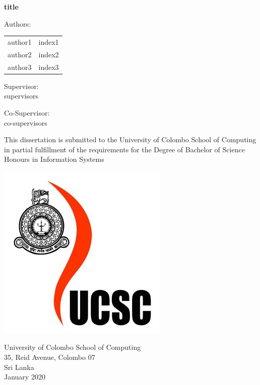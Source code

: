 \documentclass[12pt,a4paper]{report}
\begin{document}
\begin{titlepage}
    \begin{center}
        \textbf{\huge{ \fontsize{24pt}{24pt}\selectfont title}}
        \vspace{1.5cm}
        
        Authors:\\
        \begin{center}
            \begin{tabular}{ l l }
                 author1 & index1  \\ 
                 author2 & index2  \\  
                 author3 & index3    
            \end{tabular}
        \end{center}
        \vspace{1cm}
        Supervisor:\\
        \vspace{0.2cm}
        \small{supervisors}\\
        \vspace{1cm}
        
        Co-Supervisor:\\
        \vspace{0.2cm}
        \small{co-supervisors}\\
        \vspace{1.5cm}
        
        This dissertation is submitted to the University of Colombo School of Computing in partial fulfillment of the requirements for the Degree of Bachelor of Science Honours in Information Systems
        \vspace{1.8cm}
        
        \includegraphics[scale=0.25]{ucsc.jpg}\\
        \vspace{1.5cm}
        
        University of Colombo School of Computing\\
        35, Reid Avenue, Colombo 07\\
        Sri Lanka\\
        January 2020
    \end{center}
\end{titlepage}
\end{document}
